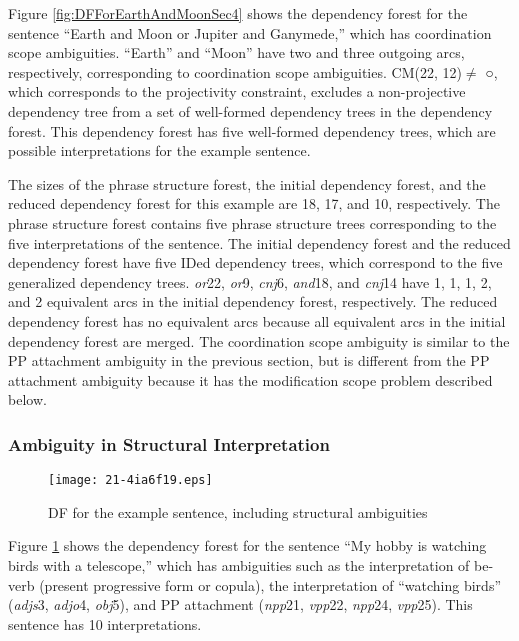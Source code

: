 \documentclass[english]{jnlp_1.4_rep}
\theoremstyle{break}
\theoremstyle{plain}
\theoremstyle{plain}
\begin{document}
Figure \ref{fig:DFForEarthAndMoonSec4} shows the dependency forest for
the sentence ``Earth and Moon or Jupiter and Ganymede,'' which has
coordination scope ambiguities. ``Earth'' and ``Moon'' have two and
three outgoing arcs, respectively, corresponding to coordination scope
ambiguities. CM(22, 12)${\neq}$ ○, which corresponds to the
projectivity constraint, excludes a non-projective dependency tree
from a set of well-formed dependency trees in the dependency
forest. This dependency forest has five well-formed dependency trees,
which are possible interpretations for the example sentence.

The sizes of the phrase structure forest, the initial dependency
forest, and the reduced dependency forest for this example are 18, 17,
and 10, respectively. The phrase structure forest contains five phrase
structure trees corresponding to the five interpretations of the
sentence. The initial dependency forest and the reduced dependency
forest have five IDed dependency trees, which correspond to the five
generalized dependency trees. \textit{or}22, \textit{or}9, \textit{cnj}6, \textit{and}18, and \textit{cnj}14
have 1, 1, 1, 2, and 2 equivalent arcs in the initial dependency
forest, respectively. The reduced dependency forest has no equivalent
arcs because all equivalent arcs in the initial dependency forest are
merged. The coordination scope ambiguity is similar to the
PP attachment ambiguity in the previous section, but is different from
the PP attachment ambiguity because it has the modification scope
problem described below.


\subsubsection{Ambiguity in Structural Interpretation}
\label{sec:AmbiguityInStructuralInterpertation}

\begin{figure}[b]
\begin{center}
\texttt{[image: 21-4ia6f19.eps]}
\end{center}
\caption{DF for the example sentence, including structural ambiguities}
\label{fig:DFForMyHobbyIsSec4}
\end{figure}

Figure \ref{fig:DFForMyHobbyIsSec4} shows the dependency forest for the
sentence ``My hobby is watching birds with a telescope,'' which has
ambiguities such as the interpretation of be-verb (present progressive
form or copula), the interpretation of ``watching birds''
(\textit{adjs}3, \textit{adjo}4, \textit{obj}5), and PP attachment
(\textit{npp}21, \textit{vpp}22, \textit{npp}24, \textit{vpp}25). This sentence has 10
interpretations.
\end{document}
